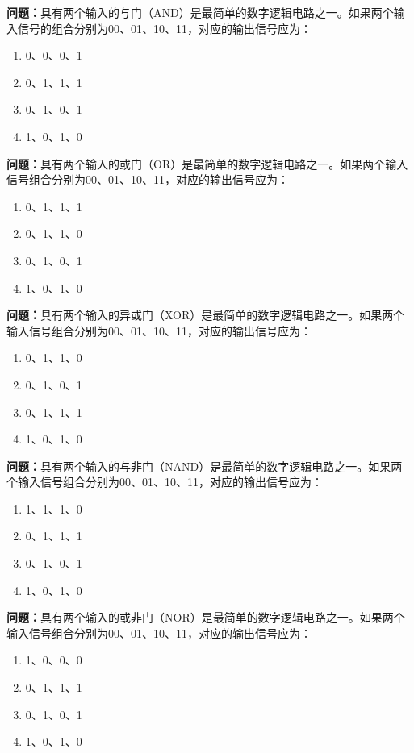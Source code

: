 \bigskip


\noindent\textbf{问题：}具有两个输入的与门（AND）是最简单的数字逻辑电路之一。如果两个输入信号的组合分别为00、01、10、11，对应的输出信号应为：
\begin{enumerate}[label=\Alph*), leftmargin=3em]
\item 0、0、0、1
\item 0、1、1、1
\item 0、1、0、1
\item 1、0、1、0
\end{enumerate}

\bigskip


\noindent\textbf{问题：}具有两个输入的或门（OR）是最简单的数字逻辑电路之一。如果两个输入信号组合分别为00、01、10、11，对应的输出信号应为：
\begin{enumerate}[label=\Alph*), leftmargin=3em]
\item 0、1、1、1
\item 0、1、1、0
\item 0、1、0、1
\item 1、0、1、0
\end{enumerate}

\bigskip


\noindent\textbf{问题：}具有两个输入的异或门（XOR）是最简单的数字逻辑电路之一。如果两个输入信号组合分别为00、01、10、11，对应的输出信号应为：
\begin{enumerate}[label=\Alph*), leftmargin=3em]
\item 0、1、1、0
\item 0、1、0、1
\item 0、1、1、1
\item 1、0、1、0
\end{enumerate}

\bigskip


\noindent\textbf{问题：}具有两个输入的与非门（NAND）是最简单的数字逻辑电路之一。如果两个输入信号组合分别为00、01、10、11，对应的输出信号应为：
\begin{enumerate}[label=\Alph*), leftmargin=3em]
\item 1、1、1、0
\item 0、1、1、1
\item 0、1、0、1
\item 1、0、1、0
\end{enumerate}

\bigskip


\noindent\textbf{问题：}具有两个输入的或非门（NOR）是最简单的数字逻辑电路之一。如果两个输入信号组合分别为00、01、10、11，对应的输出信号应为：
\begin{enumerate}[label=\Alph*), leftmargin=3em]
\item 1、0、0、0
\item 0、1、1、1
\item 0、1、0、1
\item 1、0、1、0
\end{enumerate}

